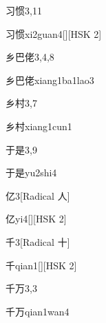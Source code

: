 \begin{entry}{习惯}{3,11}
  \begin{phonetics}{习惯}{xi2guan4}[][HSK 2]
  \end{phonetics}
\end{entry}

\begin{entry}{乡巴佬}{3,4,8}
  \begin{phonetics}{乡巴佬}{xiang1ba1lao3}
  \end{phonetics}
\end{entry}

\begin{entry}{乡村}{3,7}
  \begin{phonetics}{乡村}{xiang1cun1}
  \end{phonetics}
\end{entry}

\begin{entry}{于是}{3,9}
  \begin{phonetics}{于是}{yu2shi4}
  \end{phonetics}
\end{entry}

\begin{entry}{亿}{3}[Radical 人]
  \begin{phonetics}{亿}{yi4}[][HSK 2]
  \end{phonetics}
\end{entry}

\begin{entry}{千}{3}[Radical 十]
  \begin{phonetics}{千}{qian1}[][HSK 2]
  \end{phonetics}
\end{entry}

\begin{entry}{千万}{3,3}
  \begin{phonetics}{千万}{qian1wan4}
  \end{phonetics}
\end{entry}

